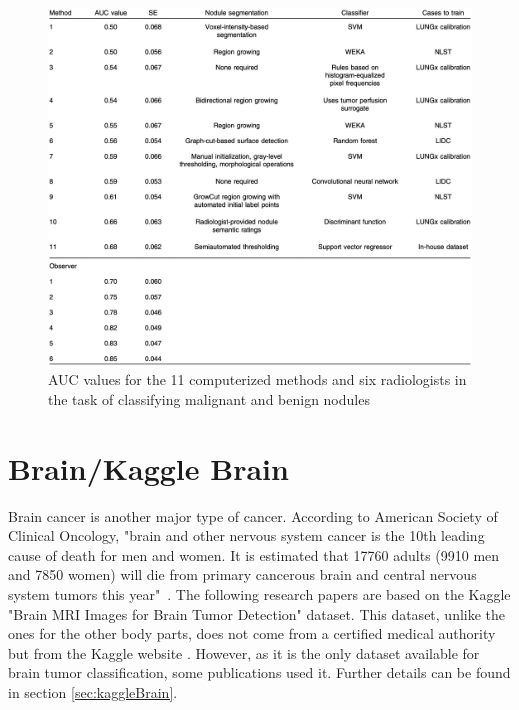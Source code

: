 \begin{figure}[!h]
\centering
\includegraphics[width=1\textwidth, keepaspectratio=true]{./figures/LUNGx_challenge_all_results.png}
\caption{AUC values for the 11 computerized methods and six radiologists in the task of classifying malignant and benign nodules~\cite{12}}
\label{fig:LUNGx_challenge_all_results}
\end{figure}



\section{Brain/Kaggle Brain}

\setlength{\marginparwidth}{3cm}\leavevmode {}Brain cancer is another major type of cancer. According to American Society of Clinical Oncology, "brain and other nervous system cancer is the 10th leading cause of death for men and women. It is estimated that 17760 adults (9910 men and 7850 women) will die from primary cancerous brain and central nervous system tumors this year"~\cite{43}. The following research papers are based on the Kaggle "Brain MRI Images for Brain Tumor Detection" dataset. This dataset, unlike the ones for the other body parts, does not come from a certified medical authority but from the Kaggle website \cite{45}. However, as it is the only dataset available for brain tumor classification, some publications used it. Further details can be found in section \ref{sec:kaggleBrain}.

